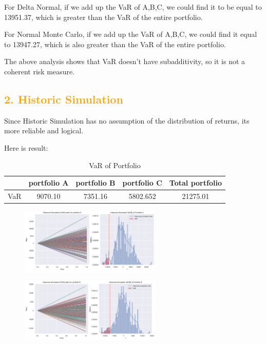 \documentclass[11pt,en]{elegantpaper}
\begin{document}
For Delta Normal, if we add up the VaR of A,B,C, we could find it to be
equal to 13951.37, which is greater than the VaR of the entire portfolio. 

For Normal Monte Carlo, if we add up the VaR of A,B,C, we could find it
equal to 13947.27, which is also greater than the VaR of the entire portfolio. 

The above analysis shows that VaR doesn't have subadditivity, so it is not a coherent risk measure.

\subsection*{\textcolor{orange}{2. Historic Simulation}}

Since Historic Simulation has no assumption of the distribution of returns, its more reliable and logical.

Here is result:

\begin{table}[htbp]
    \centering
    \caption{VaR of Portfolio}
    \begin{tabular}{@{}ccccc@{}}
        \toprule
        \textbf{} & \textbf{portfolio A} & \textbf{portfolio B} & \textbf{portfolio C} & \textbf{Total portfolio}\\
        \midrule
        VaR & 9070.10  & 7351.16 & 5802.652 & 21275.01 \\
        \bottomrule
    \end{tabular}
\end{table}

\begin{figure}[htbp] 
    \centering 
    \includegraphics[width=0.6\textwidth]{./image/His_A.png} 
\end{figure}

\begin{figure}[htbp] 
    \centering 
    \includegraphics[width=0.6\textwidth]{./image/His_B.png} 
\end{figure}
\end{document}

